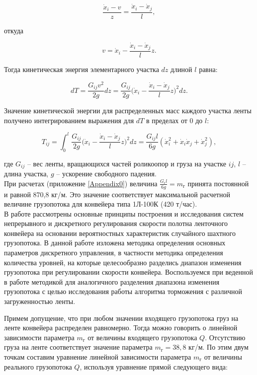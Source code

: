 $$ \frac{\dot x_i - v}{z} = \frac{\dot x_i - \dot x_j}{l}, $$

откуда 

$$ v = \dot x_i - \frac{\dot x_i - \dot x_j}{l}z. $$

Тогда кинетическая энергия элементарного участка $ dz $ длиной $ l $ равна:

$$ dT = \frac{G_{ij}v^2}{2g}dz = \frac{G_{ij}}{2g} \Big( \dot x_i - \frac{\dot x_i - \dot x_j}{l}z \Big)^2 dz. $$

Значение кинетической энергии для распределенных масс каждого участка ленты получено интегрированием выражения для $ dT $ в пределах от 0 до $ l $:

$$ T_{ij} = \int_0^l \frac{G_{ij}}{2g} \Big( \dot x_i - \frac{\dot x_i - \dot x_j}{l}z \Big)^2 dz = \frac{G_{ij}l}{6g}(\dot x_i^2 + \dot x_i \dot x_j + \dot x_j^2), $$

где $ G_{ij} $ -- вес ленты, вращающихся частей роликоопор и груза на участке $ ij $, $ l $ -- длина участка, $ g $ -- ускорение свободного падения.
\\

При расчетах (приложение \ref{Appendix0}) величина $ \frac{G_\text{г}l}{6g} = m_\text{г} $ принята постоянной и равной 870,8 кг/м. Это значение соответствует максимальной расчетной величине грузопотока для конвейера типа 1Л-100К (420 т/час).\\

В работе \cite{alobacheva} рассмотрены основные принципы построения и исследования систем непрерывного и дискретного регулирования скорости полотна ленточного конвейера на основании вероятностных характеристик случайного шахтного грузопотока. В данной работе изложена методика определения основных параметров дискретного управления, в частности методика определения количества уровней, на которые целесообразно разделись диапазон изменения грузопотока при регулировании скорости конвейера. Воспользуемся при веденной в работе методикой для аналогичного разделения диапазона изменения грузопотока с целью исследования работы алгоритма торможения с различной загруженностью ленты.

Примем допущение, что при любом значении входящего грузопотока груз на ленте конвейера распределен равномерно. Тогда можно говорить о линейной зависимости параметра $ m_\text{г} $ от величины входящего грузопотока $ Q $. Отсутствию груза на ленте соответствует значение параметра $ m_\text{г} = 38,8 $ кг/м. По этим двум точкам составим уравнение линейной зависимости параметра $ m_\text{г} $ от величины реального грузопотока $ Q $, используя уравнение прямой следующего вида:

